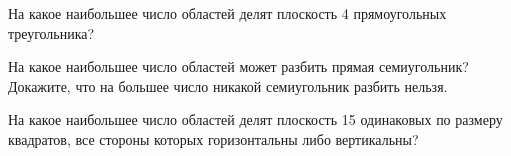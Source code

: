 ﻿
\begin{itemize}

\itA На какое наибольшее число областей делят плоскость 4 прямоугольных треугольника?

\itB На какое наибольшее число областей может разбить прямая семиугольник? Докажите, что на большее число никакой семиугольник разбить нельзя.

\itC На какое наибольшее число областей делят плоскость 15 одинаковых по размеру квадратов, все стороны которых горизонтальны либо вертикальны?
\end{itemize}